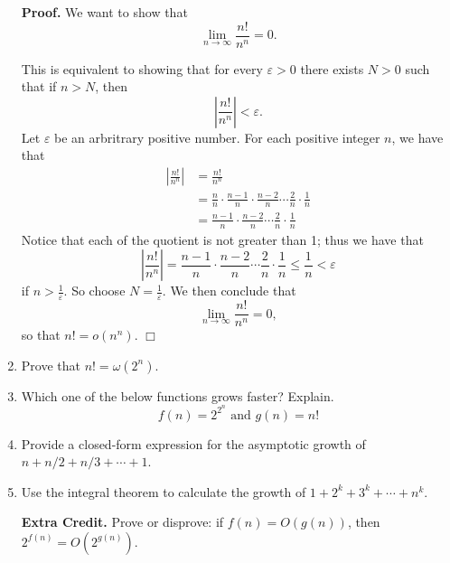 \documentclass[9pt]{article}
\newcommand{\qed}{\hfill \ensuremath{\Box}}
\begin{document}
\begin{enumerate}
      \textbf{Proof.} We want to show that
      $$\lim_{n \rightarrow \infty} \frac{n!}{n^n} = 0.$$
   
      This is equivalent to showing that for every $\varepsilon > 0$ there
      exists $N > 0$ such that if $n > N$, then
      $$\left|\frac{n!}{n^n}\right| < \varepsilon.$$
      Let $\varepsilon$ be an arbritrary positive number. For each positive
      integer $n$, we have that
      \begin{align*}
         \left|\frac{n!}{n^n}\right| &= \frac{n!}{n^n} \\
            &= \frac{n}{n} \cdot \frac{n-1}{n} \cdot \frac{n-2}{n} \cdots
               \frac{2}{n} \cdot \frac{1}{n} \\
            &= \frac{n-1}{n} \cdot \frac{n-2}{n} \cdots
               \frac{2}{n} \cdot \frac{1}{n}
      \end{align*}
      Notice that each of the quotient is not greater than 1; thus we have
      that
      $$\left|\frac{n!}{n^n}\right| = \frac{n-1}{n} \cdot \frac{n-2}{n} \cdots
        \frac{2}{n} \cdot \frac{1}{n} \le \frac{1}{n} < \varepsilon$$
      if $n > \frac{1}{\varepsilon}$. So choose $N = \frac{1}{\varepsilon}$. We
      then conclude that
      $$\lim_{n \rightarrow \infty} \frac{n!}{n^n} = 0,$$
      so that $n! = o(n^n)$. \qed
   \item Prove that $n! = \omega(2^n)$.
   \item Which one of the below functions grows faster? Explain.
         $$f(n) = 2^{2^n} \text{ and } g(n) = n!$$
   \item Provide a closed-form expression for the asymptotic growth of
         $n + n/2 + n/3 + \cdots + 1$.
   \item Use the integral theorem to calculate the growth of
         $1 + 2^k + 3^k + \cdots + n^k$.
   \item[\textbf{Extra Credit.}] Prove or disprove: if $f(n) = O(g(n))$, then
                                 $2^{f(n)} = O(2^{g(n)})$.
      
\end{enumerate}
\end{document}
